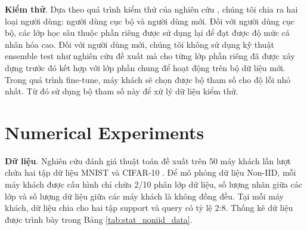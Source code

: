 \documentclass[runningheads]{llncs}
\begin{document}
\textbf{Kiểm thử}. Dựa theo quá trình kiểm thử của nghiên cứu \cite{liang2020think}, chúng tôi chia ra hai loại người dùng: người dùng cục bộ và người dùng mới. Đối với người dùng cục bộ, các lớp học sâu thuộc phần riêng được sử dụng lại để đạt được độ mức cá nhân hóa cao. Đối với người dùng mới, chúng tôi không sử dụng kỹ thuật ensemble test như nghiên cứu \cite{liang2020think} đề xuất mà cho từng lớp phần riêng đã được xây dựng trước đó kết hợp với lớp phần chung để hoạt động trên bộ dữ liệu mới. Trong quá trình fine-tune, máy khách sẽ chọn được bộ tham số cho độ lỗi nhỏ nhất. Từ đó sử dụng bộ tham số này để xử lý dữ liệu kiểm thử.

\section{Numerical Experiments}

\textbf{Dữ liệu}. Nghiên cứu đánh giá thuật toán đề xuất trên 50 máy khách lần lượt chứa hai tập dữ liệu MNIST \cite{deng2012mnist} và CIFAR-10 \cite{krizhevsky2009learning}. Để mô phỏng dữ liệu Non-IID, mỗi máy khách được cấu hình chỉ chứa 2/10 phân lớp dữ liệu, số lượng nhãn giữa các lớp và số lượng dữ liệu giữa các máy khách là không đồng đều. Tại mỗi máy khách, dữ liệu chia cho hai tập support và query có tỷ lệ 2:8. Thống kê dữ liệu được trình bày trong Bảng \ref{tab:stat_noniid_data}.

\begin{table}[h]
    \caption{Statistics on MNIST and CIFAR-10 (Non-IID data)}
    \label{tab:stat_noniid_data}
\end{table}
\end{document}
